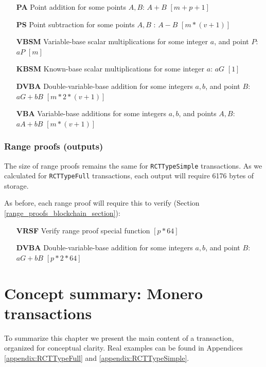 \begin{itemize}
    \setlength\itemsep{\listspace}
    \item [\textbf{PA}] Point addition for some points $A, B$: $A + B$ \quad \([m + p + 1]\)%
    \item [\textbf{PS}] Point subtraction for some points $A, B$ : $A - B$ \quad \([m*(v+1)]\) %
    \item [\textbf{VBSM}] Variable-base scalar multiplications for some integer $a$, and point $P$: $a P$ \quad \([m]\)
    \item [\textbf{KBSM}] Known-base scalar multiplications for some integer $a$: $a G$ \quad \([1]\)
    \item [\textbf{DVBA}] Double-variable-base addition for some integers $a, b$, and point $B$: $a G + b B$ \quad \([m*2*(v+1)]\)
    \item [\textbf{VBA}] Variable-base additions for some integers $a, b$, and points $A, B$: $a A + b B$ \quad \([m*(v+1)]\)
\end{itemize}

\subsubsection*{Range proofs (outputs)}

The size of range proofs remains the same for {\tt RCTTypeSimple} transactions. As we calculated for {\tt RCTTypeFull} transactions, each output will require 6176 bytes of storage.

As before, each range proof will require this to verify (Section \ref{range_proofs_blockchain_section}):

\begin{itemize}
    \setlength\itemsep{\listspace}
    \item [\textbf{VRSF}] Verify range proof special function \quad \([p*64]\)
    \item [\textbf{DVBA}] Double-variable-base addition for some integers $a, b$, and point $B$: $a G + b B$ \quad \([p*2*64]\)
\end{itemize}


\newpage
\section{Concept summary: Monero transactions}
\label{sec:transaction_summary}

To summarize this chapter we present the main content of a transaction, organized for conceptual clarity. Real examples can be found in Appendices \ref{appendix:RCTTypeFull} and \ref{appendix:RCTTypeSimple}.


